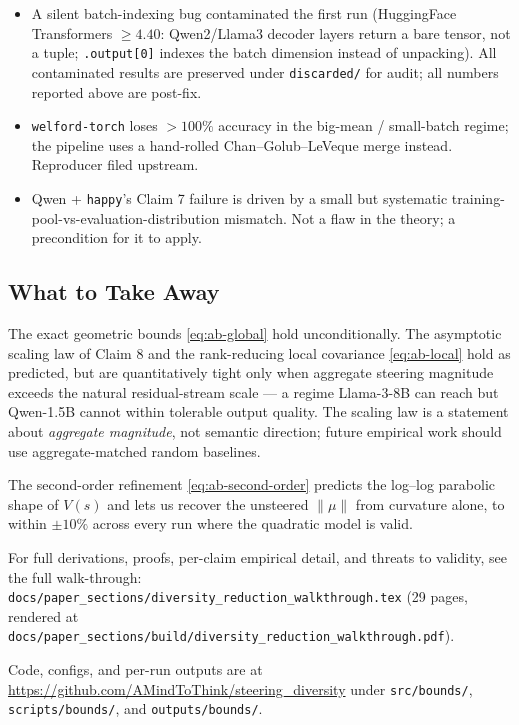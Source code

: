 \begin{itemize}
  \item A silent batch-indexing bug contaminated the first run
    (HuggingFace Transformers $\ge 4.40$: Qwen2/Llama3 decoder layers
    return a bare tensor, not a tuple; \texttt{.output[0]} indexes the
    batch dimension instead of unpacking). All contaminated results
    are preserved under \texttt{discarded/} for audit; all numbers
    reported above are post-fix.
  \item \texttt{welford-torch} loses $>100\%$ accuracy in the
    big-mean / small-batch regime; the pipeline uses a hand-rolled
    Chan--Golub--LeVeque merge instead. Reproducer filed upstream.
  \item Qwen + \texttt{happy}'s Claim 7 failure is driven by a small but
    systematic training-pool-vs-evaluation-distribution mismatch. Not a
    flaw in the theory; a precondition for it to apply.
\end{itemize}

\subsection{What to Take Away}

The exact geometric bounds \eqref{eq:ab-global} hold unconditionally. The
asymptotic scaling law of Claim 8 and the rank-reducing local covariance
\eqref{eq:ab-local} hold as predicted, but are quantitatively tight only
when aggregate steering magnitude exceeds the natural residual-stream
scale --- a regime Llama-3-8B can reach but Qwen-1.5B cannot within
tolerable output quality. The scaling law is a statement about
\emph{aggregate magnitude}, not semantic direction; future empirical
work should use aggregate-matched random baselines.

The second-order refinement \eqref{eq:ab-second-order} predicts the
log--log parabolic shape of $V(s)$ and lets us recover the unsteered
$\|\mu\|$ from curvature alone, to within $\pm 10\%$ across every run
where the quadratic model is valid.

For full derivations, proofs, per-claim empirical detail, and threats
to validity, see the full walk-through:
\texttt{docs/paper\_sections/diversity\_reduction\_walkthrough.tex}
(29 pages, rendered at
\texttt{docs/paper\_sections/build/diversity\_reduction\_walkthrough.pdf}).

Code, configs, and per-run outputs are at
\url{https://github.com/AMindToThink/steering_diversity} under
\texttt{src/bounds/}, \texttt{scripts/bounds/}, and
\texttt{outputs/bounds/}.
